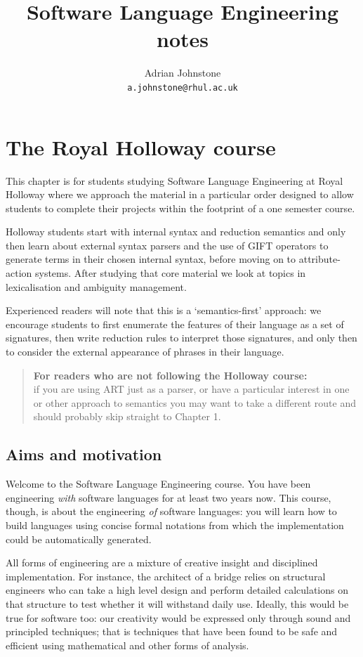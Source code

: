 \documentclass[11pt]{book}
\title{Software Language Engineering notes}
\author{Adrian Johnstone\\{\small\tt a.johnstone@rhul.ac.uk}}
\begin{document}
\makecstitle
{}
\setcounter{page}{1}
\tableofcontents
\setcounter{chapter}{-1} 
\chapter{The Royal Holloway course}
This chapter is for students studying Software Language Engineering at Royal Holloway where we approach the material in a particular order designed to allow students to complete their projects within the footprint of a one semester course. 

Holloway students start with internal syntax and reduction semantics and only then learn about external syntax parsers and the use of GIFT operators to generate terms in their chosen internal syntax, before moving on to attribute-action systems. After studying that core material we look at topics in lexicalisation and ambiguity management. 

Experienced readers will note that this is a `semantics-first' approach: we encourage students to first enumerate the features of their language as a set of signatures, then write reduction rules to interpret those signatures, and only then to consider the external appearance of phrases in their language.

\begin{quote}
{\bf For readers who are not following the Holloway course:}\\[0.5ex] if you are using ART just as a parser, or have a particular interest in one or other approach to semantics you may want to take a different route and should probably skip straight to Chapter 1.
\end{quote}
\clearpage
\section{Aims and motivation}
Welcome to the Software Language Engineering course. You have been engineering {\em with} software languages for at least two years now. This course, though, is about the
engineering {\em of} software languages: you will learn how to build languages using concise formal notations
from which the implementation could be automatically generated.

All forms of engineering are a mixture of creative insight and disciplined implementation. For instance, the
architect of a bridge relies on structural engineers who can take a high level design and perform detailed
calculations on that structure to test whether it will withstand daily use. Ideally, this would be true for software too: our creativity would be expressed only through sound and
principled techniques; that is techniques that have been found to be safe and efficient using mathematical
and other forms of analysis.
\end{document}
